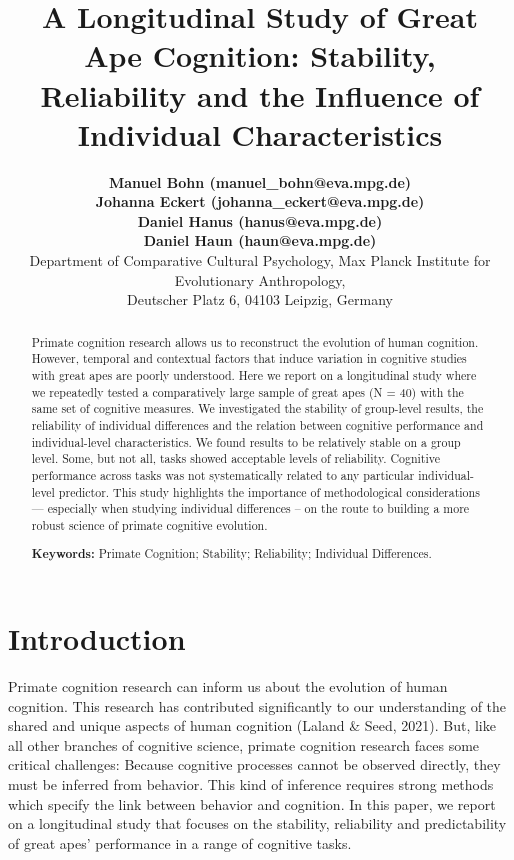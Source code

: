 \documentclass[10pt, letterpaper]{article}
\title{A Longitudinal Study of Great Ape Cognition: Stability,
Reliability and the Influence of Individual Characteristics}
\author{{\large \bf Manuel Bohn (manuel\_bohn@eva.mpg.de)} \\ {\large \bf Johanna Eckert (johanna\_eckert@eva.mpg.de)} \\ {\large \bf Daniel Hanus (hanus@eva.mpg.de)} \\ {\large \bf Daniel Haun (haun@eva.mpg.de)} \\ Department of Comparative Cultural Psychology, Max Planck Institute for Evolutionary Anthropology, \\ Deutscher Platz 6, 04103 Leipzig, Germany}
\begin{document}
\maketitle

\begin{abstract}
Primate cognition research allows us to reconstruct the evolution of
human cognition. However, temporal and contextual factors that induce
variation in cognitive studies with great apes are poorly understood.
Here we report on a longitudinal study where we repeatedly tested a
comparatively large sample of great apes (N = 40) with the same set of
cognitive measures. We investigated the stability of group-level
results, the reliability of individual differences and the relation
between cognitive performance and individual-level characteristics. We
found results to be relatively stable on a group level. Some, but not
all, tasks showed acceptable levels of reliability. Cognitive
performance across tasks was not systematically related to any
particular individual-level predictor. This study highlights the
importance of methodological considerations --- especially when studying
individual differences -- on the route to building a more robust science
of primate cognitive evolution.

\textbf{Keywords:}
Primate Cognition; Stability; Reliability; Individual Differences.
\end{abstract}

\hypertarget{introduction}{%
\section{Introduction}\label{introduction}}

Primate cognition research can inform us about the evolution of human
cognition. This research has contributed significantly to our
understanding of the shared and unique aspects of human cognition
(Laland \& Seed, 2021). But, like all other branches of cognitive
science, primate cognition research faces some critical challenges:
Because cognitive processes cannot be observed directly, they must be
inferred from behavior. This kind of inference requires strong methods
which specify the link between behavior and cognition. In this paper, we
report on a longitudinal study that focuses on the stability,
reliability and predictability of great apes' performance in a range of
cognitive tasks.
\end{document}
